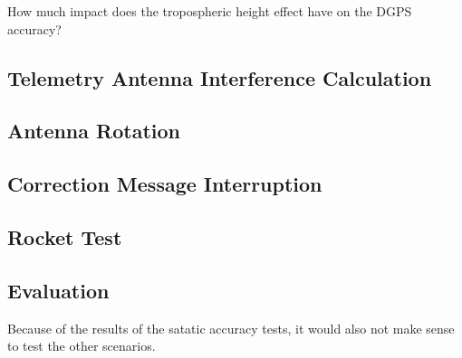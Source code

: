 How much impact does the tropospheric height effect have on the DGPS accuracy?

\subsection{Telemetry Antenna Interference Calculation}

\subsection{Antenna Rotation}

\subsection{Correction Message Interruption}

\subsection{Rocket Test}

\subsection{Evaluation}

Because of the results of the satatic accuracy tests, it would also not make sense to test the other scenarios.